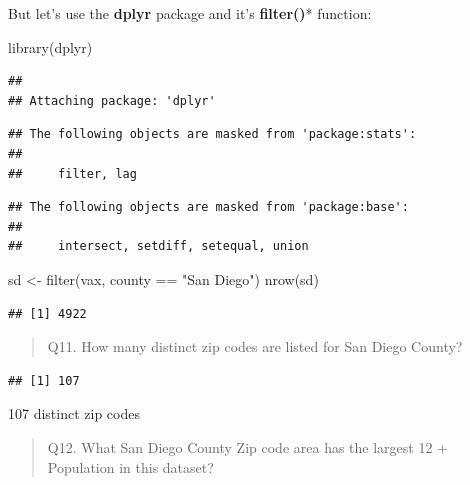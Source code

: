 \documentclass[
]{article}
\newenvironment{Shaded}{\begin{snugshade}}{\end{snugshade}}
\newcommand{\FunctionTok}[1]{\textcolor[rgb]{0.00,0.00,0.00}{#1}}
\newcommand{\NormalTok}[1]{#1}
\newcommand{\OtherTok}[1]{\textcolor[rgb]{0.56,0.35,0.01}{#1}}
\newcommand{\SpecialCharTok}[1]{\textcolor[rgb]{0.00,0.00,0.00}{#1}}
\newcommand{\StringTok}[1]{\textcolor[rgb]{0.31,0.60,0.02}{#1}}
\begin{document}
But let's use the \textbf{dplyr} package and it's \textbf{filter()}*
function:

\begin{Shaded}
\begin{Highlighting}[]
\FunctionTok{library}\NormalTok{(dplyr)}
\end{Highlighting}
\end{Shaded}

\begin{verbatim}
## 
## Attaching package: 'dplyr'
\end{verbatim}

\begin{verbatim}
## The following objects are masked from 'package:stats':
## 
##     filter, lag
\end{verbatim}

\begin{verbatim}
## The following objects are masked from 'package:base':
## 
##     intersect, setdiff, setequal, union
\end{verbatim}

\begin{Shaded}
\begin{Highlighting}[]
\NormalTok{sd }\OtherTok{\textless{}{-}} \FunctionTok{filter}\NormalTok{(vax, county }\SpecialCharTok{==} \StringTok{"San Diego"}\NormalTok{)}
\FunctionTok{nrow}\NormalTok{(sd)}
\end{Highlighting}
\end{Shaded}

\begin{verbatim}
## [1] 4922
\end{verbatim}

\begin{quote}
Q11. How many distinct zip codes are listed for San Diego County?
\end{quote}

\begin{Shaded}
\end{Shaded}

\begin{verbatim}
## [1] 107
\end{verbatim}

107 distinct zip codes

\begin{quote}
Q12. What San Diego County Zip code area has the largest 12 + Population
in this dataset?
\end{quote}
\end{document}
